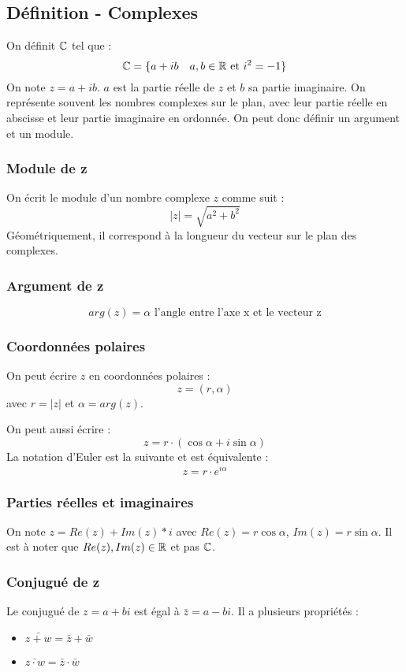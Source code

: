 \documentclass[12pt]{article}
\begin{document}
\subsection{Définition - Complexes}
On définit $\mathbb{C}$ tel que :
$$ \mathbb{C} = \{a+ib \quad a,b \in \mathbb{R} \text{ et } i^2 = -1\}$$
On note $z=a+ib$.
$a$ est la partie réelle de $z$ et $b$ sa partie imaginaire. On représente souvent les nombres complexes sur le plan, avec leur partie réelle en abscisse et leur partie imaginaire en ordonnée. On peut donc définir un argument et un module.



\subsubsection{Module de z}
On écrit le module d'un nombre complexe $z$ comme suit :
$$|z| = \sqrt{a^2+b^2}$$
Géométriquement, il correspond à la longueur du vecteur sur le plan des complexes.

\subsubsection{Argument de z}
$$arg(z) = \alpha \text{ l'angle entre l'axe x et le vecteur z}$$

\subsubsection{Coordonnées polaires}
On peut écrire $z$ en coordonnées polaires :
$$z = (r, \alpha)$$
avec $r=|z|$ et $\alpha = arg(z)$.

On peut aussi écrire :
$$z = r \cdot (\cos \alpha + i \sin \alpha)$$
La notation d'Euler est la suivante et est équivalente :
$$
z = r \cdot e^{i \alpha}
$$

\subsubsection{Parties réelles et imaginaires}
On note $z = Re(z) + Im(z)*i$ avec $Re(z) = r \cos \alpha$, $Im(z) = r \sin \alpha$.
Il est à noter que $Re(z), Im(z) \in \mathbb{R}$ et pas $\mathbb{C}$.

\subsubsection{Conjugué de z}
Le conjugué de $z = a + bi$ est égal à $\bar z = a - bi$.
Il a plusieurs propriétés :
\begin{itemize}
    \item $\bar{z+w} = \bar z + \bar w$
    \item $\bar{z \cdot w} = \bar z \cdot \bar w$
\end{itemize}
\end{document}
